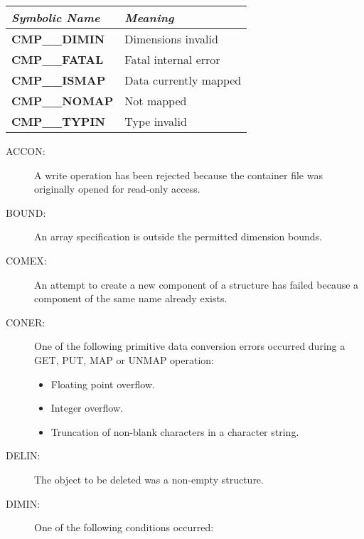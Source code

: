 \documentclass[11pt]{article}
\newcommand{\htmlref}[2]{#1}
\newcommand{\st}[1]{{\em{#1}}}
\begin{document}
\begin{center}
\begin{tabular}{|l|l|} \hline
\st{Symbolic Name} & \st{Meaning}\\ \hline \hline
{\bf CMP\_\_DIMIN} & Dimensions invalid\\
{\bf CMP\_\_FATAL} & Fatal internal error\\
{\bf CMP\_\_ISMAP} & Data currently mapped\\
{\bf CMP\_\_NOMAP} & Not mapped\\
{\bf CMP\_\_TYPIN} & Type invalid\\[2ex]
\hline
\end{tabular}
\end{center}
\normalsize

\begin{description}

\item [ACCON:]
A write operation has been rejected because the container file was originally
opened for read-only access.

\item [BOUND:]
An array specification is outside the permitted dimension bounds.

\item [COMEX:]
An attempt to create a new component of a structure has failed because a
component of the same \htmlref{name}{sect:name} already exists.

\item [CONER:]
One of the following primitive data conversion errors occurred during a 
GET, PUT, MAP or UNMAP operation:

\begin{itemize}

\item Floating point overflow.

\item Integer overflow.

\item Truncation of non-blank characters in a character string.

\end{itemize}

\item [DELIN:]
The object to be deleted was a non-empty structure.

\item [DIMIN:]
One of the following conditions occurred:

\begin{itemize}


\end{itemize}
\end{description}
\end{document}
